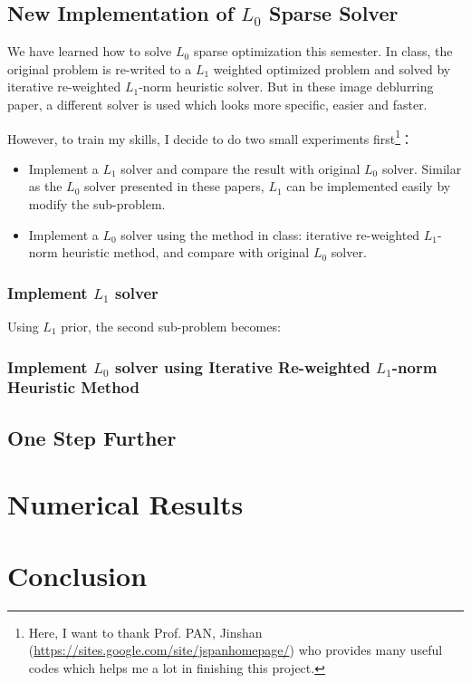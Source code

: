 \documentclass[journal, onecolumn, 10pt]{IEEEtran}
\begin{document}
\subsection{New Implementation of $L_0$ Sparse Solver}
We have learned how to solve $L_0$ sparse optimization this semester. In class, the original problem is re-writed to a $L_1$ weighted optimized problem and solved by iterative re-weighted $L_1$-norm heuristic solver. But in these image deblurring paper, a different solver is used which looks more specific, easier and faster.

However, to train my skills, I decide to do two small experiments first\footnote{Here, I want to thank Prof. PAN, Jinshan (\url{https://sites.google.com/site/jspanhomepage/}) who provides many useful codes which helps me a lot in finishing this project. }：
\begin{itemize}
\item Implement a $L_1$ solver and compare the result with original $L_0$ solver. Similar as the $L_0$ solver presented in these papers\cite{xu2013unnatural}\cite{pan2014deblurring}, $L_1$ can be implemented easily by modify the sub-problem.
\item Implement a $L_0$ solver using the method in class: iterative re-weighted $L_1$-norm heuristic method, and compare with original $L_0$ solver. 
\end{itemize}

\subsubsection{Implement $L_1$ solver}
Using $L_1$ prior, the second sub-problem becomes:

\subsubsection{Implement $L_0$ solver using Iterative Re-weighted $L_1$-norm Heuristic Method}

\subsection{One Step Further}


\section{Numerical Results}

\section{Conclusion}

\newpage




\end{document}
